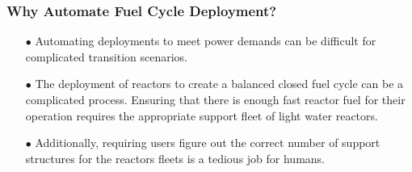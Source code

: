 \begin{frame}
  \frametitle{Why Automate Fuel Cycle Deployment?}
  \begin{itemize}
      \item[$\bullet$] Automating deployments to meet power demands can be difficult for complicated
                       transition scenarios. 
      \item[$\bullet$] The deployment of reactors to create a balanced closed fuel cycle can be a 
                       complicated process. Ensuring that there is enough fast reactor fuel for
                       their operation requires the appropriate support fleet of light water reactors.
      \item[$\bullet$] Additionally, requiring users figure out the correct number of support
                       structures for the reactors fleets is a tedious job for humans.
   \end{itemize}        
\end{frame}
